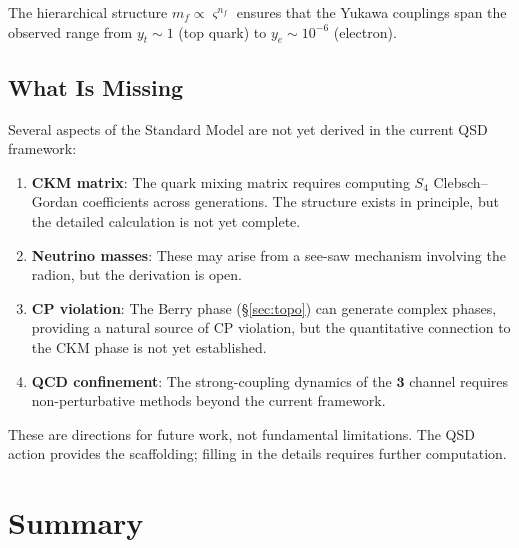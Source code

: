 \documentclass[11pt,a4paper]{article}
\theoremstyle{definition}
\theoremstyle{remark}
\newcommand{\strain}{\varsigma}
\begin{document}
The hierarchical structure $m_f \propto \strain^{n_f}$ ensures that the Yukawa couplings span the observed range from $y_t \sim 1$ (top quark) to $y_e \sim 10^{-6}$ (electron).

\subsection{What Is Missing}

Several aspects of the Standard Model are not yet derived in the current QSD framework:

\begin{enumerate}[nosep]
\item \textbf{CKM matrix}: The quark mixing matrix requires computing $S_4$ Clebsch--Gordan coefficients across generations. The structure exists in principle, but the detailed calculation is not yet complete.

\item \textbf{Neutrino masses}: These may arise from a see-saw mechanism involving the radion, but the derivation is open.

\item \textbf{CP violation}: The Berry phase (\S\ref{sec:topo}) can generate complex phases, providing a natural source of CP violation, but the quantitative connection to the CKM phase is not yet established.

\item \textbf{QCD confinement}: The strong-coupling dynamics of the $\mathbf{3}$ channel requires non-perturbative methods beyond the current framework.
\end{enumerate}

These are directions for future work, not fundamental limitations. The QSD action provides the scaffolding; filling in the details requires further computation.

\section{Summary}
\label{sec:summary}
\end{document}
